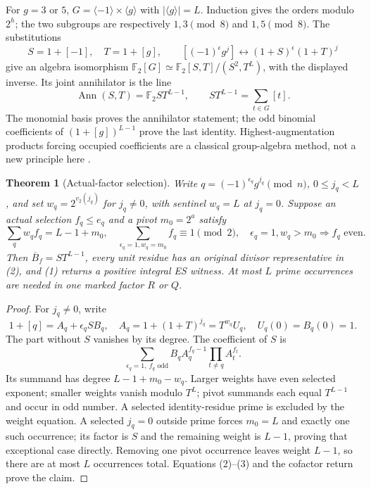 \documentclass[10pt,a4paper]{article}
\newtheorem{theorem}{Theorem}
\begin{document}
For $g=3$ or $5$, $G=\langle-1\rangle\times\langle g\rangle$ with
$|\langle g\rangle|=L$. Induction gives the orders modulo $2^h$; the two
subgroups are respectively $1,3\pmod8$ and $1,5\pmod8$. The substitutions
\[
 S=1+[-1],\quad T=1+[g],\qquad
 [(-1)^\epsilon g^j]\longleftrightarrow(1+S)^\epsilon(1+T)^j
\]
give an algebra isomorphism $\mathbb F_2[G]\simeq\mathbb F_2[S,T]/(S^2,T^L)$,
with the displayed inverse. Its joint annihilator is the line
\[
 \operatorname{Ann}(S,T)=\mathbb F_2ST^{L-1},\qquad
 ST^{L-1}=\sum_{t\in G}[t].                                \tag{3}
\]
The monomial basis proves the annihilator statement; the odd binomial
coefficients of $(1+[g])^{L-1}$ prove the last identity. Highest-augmentation
products forcing occupied coefficients are a classical group-algebra method,
not a new principle here \cite[\S1, pp.~2--3]{Petrov}.

\newpage
\begin{theorem}[Actual-factor selection]
Write $q=(-1)^{\epsilon_q}g^{j_q}\pmod n$, $0\le j_q<L$, and set
$w_q=2^{v_2(j_q)}$ for $j_q\ne0$, with sentinel $w_q=L$ at $j_q=0$.
Suppose an actual selection $f_q\le e_q$ and a pivot $m_0=2^a$ satisfy
\[
 \sum_qw_qf_q=L-1+m_0,\quad
 \sum_{\epsilon_q=1,w_q=m_0}f_q\equiv1\pmod2,\quad
 \epsilon_q=1,
w_q>m_0\Longrightarrow f_q\text{ even}.       \tag{4}
\]
Then $\overline B_f=ST^{L-1}$, every unit residue has an original divisor
representative in (2), and (1) returns a positive integral ES witness.
At most $L$ prime occurrences are needed in one marked factor $R$ or $Q$.
\end{theorem}
\begin{proof}
For $j_q\ne0$, write
\[
 1+[q]=A_q+\epsilon_qSB_q,\quad
 A_q=1+(1+T)^{j_q}=T^{w_q}U_q,\quad U_q(0)=B_q(0)=1.
\]
The part without $S$ vanishes by its degree. The coefficient of $S$ is
\[
 \sum_{\epsilon_q=1,\ f_q\text{ odd}}
 B_qA_q^{f_q-1}\prod_{t\ne q}A_t^{f_t}.
\]
Its summand has degree $L-1+m_0-w_q$. Larger weights have even selected
exponent; smaller weights vanish modulo $T^L$; pivot summands each equal
$T^{L-1}$ and occur in odd number. A selected identity-residue prime is
excluded by the weight equation. A selected $j_q=0$ outside prime forces
$m_0=L$ and exactly one such occurrence; its factor is $S$ and the remaining
weight is $L-1$, proving that exceptional case directly. Removing one pivot
occurrence leaves weight $L-1$, so there are at most $L$ occurrences total.
Equations (2)--(3) and the cofactor return prove the claim.
\end{proof}
\end{document}
